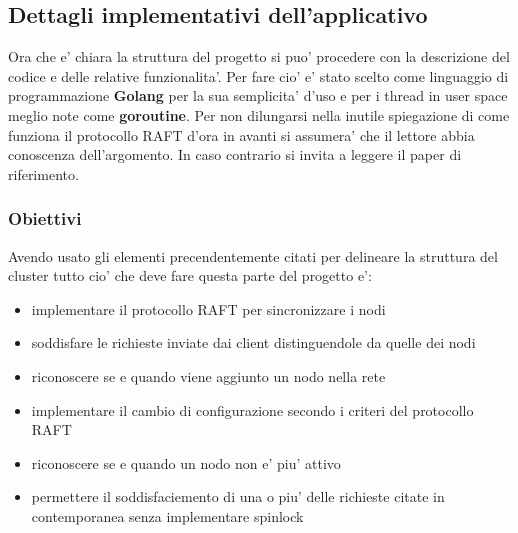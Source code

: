 \subsection{Dettagli implementativi dell'applicativo}
Ora che e' chiara la struttura del progetto si puo' procedere con la descrizione del
codice e delle relative funzionalita'. Per fare cio' e' stato scelto come linguaggio
di programmazione \textbf{Golang} per la sua semplicita' d'uso e per i thread in user space
meglio note come \textbf{goroutine}.
Per non dilungarsi nella inutile spiegazione di come funziona il protocollo RAFT d'ora in avanti
si assumera' che il lettore abbia conoscenza dell'argomento. In caso contrario si invita
a leggere il paper di riferimento.
\subsubsection{Obiettivi}
Avendo usato gli elementi precendentemente citati per delineare la struttura del cluster tutto
cio' che deve fare questa parte del progetto e':
\begin{itemize}
    \item implementare il protocollo RAFT per sincronizzare i nodi
    \item soddisfare le richieste inviate dai client distinguendole da quelle dei nodi
    \item riconoscere se e quando viene aggiunto un nodo nella rete
    \item implementare il cambio di configurazione secondo i criteri del protocollo RAFT
    \item riconoscere se e quando un nodo non e' piu' attivo
    \item permettere il soddisfaciemento di una o piu' delle richieste citate in contemporanea 
        senza implementare spinlock
\end{itemize}

